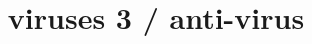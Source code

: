 \usepackage[outline,pdftex]{contour}
\graphicspath{{./figures/}}
\title{viruses 3 / anti-virus}
\date{}




